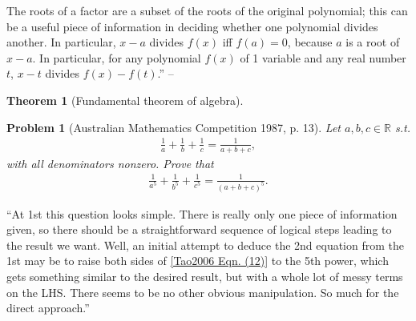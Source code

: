 \documentclass[oneside]{book}
\numberwithin{equation}{section}
\newtheorem{theorem}{Theorem}[section]
\newtheorem{problem}{Problem}[section]
\begin{document}
The roots of a factor are a subset of the roots of the original polynomial; this can be a useful piece of information in deciding whether one polynomial divides another. In particular, $x - a$ divides $f(x)$ iff $f(a) = 0$, because $a$ is a root of $x - a$. In particular, for any polynomial $f(x)$ of 1 variable and any real number $t$, $x - t$ divides $f(x) - f(t)$.'' -- \cite[p. 42]{Tao2006}

\begin{theorem}[Fundamental theorem of algebra]
	
\end{theorem}

\begin{problem}[Australian Mathematics Competition 1987, p. 13]
	Let $a,b,c\in\mathbb{R}$ s.t.
	\begin{align}
		\label{Tao2006 Eqn. (12)}
		\frac{1}{a} + \frac{1}{b} + \frac{1}{c} = \frac{1}{a + b + c},
	\end{align}
	with all denominators nonzero. Prove that
	\begin{align*}
		\frac{1}{a^5} + \frac{1}{b^5} + \frac{1}{c^5} = \frac{1}{(a + b + c)^5}.
	\end{align*}
\end{problem}
``At 1st this question looks simple. There is really only one piece of information given, so there should be a straightforward sequence of logical steps leading to the result we want. Well, an initial attempt to deduce the 2nd equation from the 1st may be to raise both sides of \eqref{Tao2006 Eqn. (12)} to the 5th power, which gets something similar to the desired result, but with a whole lot of messy terms on the LHS. There seems to be no other obvious manipulation. So much for the direct approach.''
\end{document}
